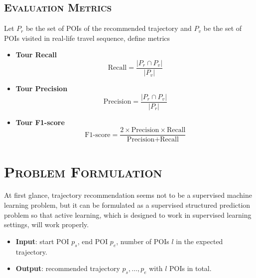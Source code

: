 \documentclass[11pt, a4paper]{article}
\begin{document}
\subsection{\textsc{Evaluation Metrics}} 
Let $P_r$ be the set of POIs of the recommended trajectory and $P_v$ be the set of POIs visited in real-life travel sequence,
define metrics\cite{lim15}
\begin{itemize}
\item \textbf{Tour Recall}
      \begin{equation*}
      \text{Recall} = \frac{\lvert P_r \cap P_v \rvert}{\lvert P_v \rvert}
      \end{equation*}
\item \textbf{Tour Precision}
      \begin{equation*}
      \text{Precision} = \frac{\lvert P_r \cap P_v \rvert}{\lvert P_r \rvert}
      \end{equation*}
\item \textbf{Tour F1-score}
      \begin{equation*}
      \text{F1-score} = \frac{2 \times \text{Precision} \times \text{Recall}}{\text{Precision} + \text{Recall}}
      \end{equation*}
\end{itemize}


\section{\textsc{Problem Formulation}}
\label{sec:formulation}
At first glance, trajectory recommendation seems not to be a supervised machine learning problem,
but it can be formulated as a supervised structured prediction problem so that 
active learning, which is designed to work in supervised learning settings, will work properly.
\begin{itemize}
\item \textbf{Input}: start POI $p_s$, end POI $p_e$, number of POIs $l$ in the expected trajectory.
\item \textbf{Output}: recommended trajectory $p_s, \dots, p_e$ with $l$ POIs in total.
\end{itemize}
\end{document}
